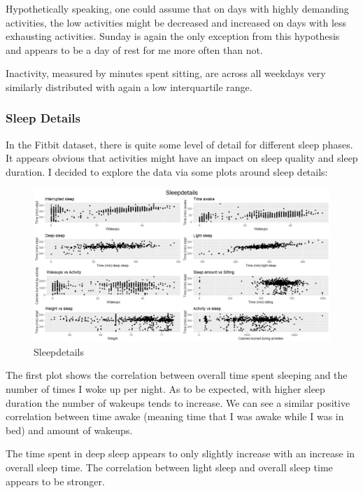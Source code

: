 \documentclass[
]{article}
\begin{document}
Hypothetically speaking, one could assume that on days with highly
demanding activities, the low activities might be decreased and
increased on days with less exhausting activities. Sunday is again the
only exception from this hypothesis and appears to be a day of rest for
me more often than not.

Inactivity, measured by minutes spent sitting, are across all weekdays
very similarly distributed with again a low interquartile range.

\hypertarget{sleep-details}{%
\subsubsection{Sleep Details}\label{sleep-details}}

In the Fitbit dataset, there is quite some level of detail for different
sleep phases. It appears obvious that activities might have an impact on
sleep quality and sleep duration. I decided to explore the data via some
plots around sleep details:

\begin{figure}
\centering
\includegraphics{./bf7a7a1effe1820d1bd6d9fb06c3ae37937c106b.png}
\caption{Sleepdetails}
\end{figure}

The first plot shows the correlation between overall time spent sleeping
and the number of times I woke up per night. As to be expected, with
higher sleep duration the number of wakeups tends to increase. We can
see a similar positive correlation between time awake (meaning time that
I was awake while I was in bed) and amount of wakeups.

The time spent in deep sleep appears to only slightly increase with an
increase in overall sleep time. The correlation between light sleep and
overall sleep time appears to be stronger.
\end{document}
